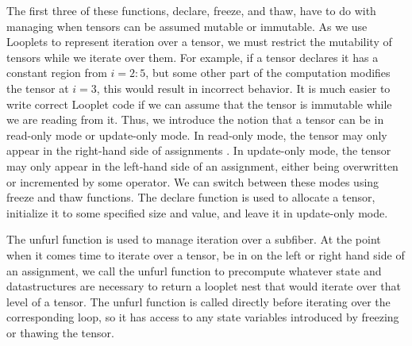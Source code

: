 The first three of these functions, declare, freeze, and thaw, have to do with
managing when tensors can be assumed mutable or immutable.
%
%
As we use Looplets to
represent iteration over a tensor, we must restrict the mutability of tensors
while we iterate over them. 
%
For example, if a tensor declares it has a constant
region from $i = 2:5$, but some other part of the computation modifies the
tensor at $i = 3$, this would result in incorrect behavior.
%
It is much easier to
write correct Looplet code if we can assume that the tensor is immutable while
we are reading from it.
%
Thus, we introduce the notion that a tensor can be in
read-only mode or update-only mode.  
%
In read-only mode, the tensor may only
appear in the right-hand side of assignments
%
. In update-only mode, the tensor
may only appear in the left-hand side of an assignment, either being overwritten
or incremented by some operator. 
%
We can switch between these modes using freeze
and thaw functions.
%
The declare function is used to allocate a tensor,
initialize it to some specified size and value, and leave it in update-only
mode. 

The unfurl function is used to manage iteration over a subfiber. 
%
At the point when it comes time to iterate over a tensor, be in on the left or right hand
side of an assignment, we call the unfurl function to precompute whatever state
and datastructures are necessary to return a looplet nest that would iterate
over that level of a tensor.
%
The unfurl function is called directly before
iterating over the corresponding loop, so it has access to any state variables introduced
by freezing or thawing the tensor.

